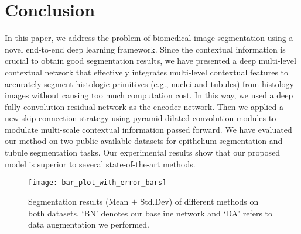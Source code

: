 \documentclass[10pt,twocolumn]{article}
\begin{document}
\section{Conclusion}\label{s5}
In this paper, we address the problem of biomedical image segmentation using a novel end-to-end deep learning framework. Since the contextual information is crucial to obtain good segmentation results, we have presented a deep multi-level contextual network that effectively integrates multi-level contextual features to accurately segment histologic primitives (e.g., nuclei and tubules) from histology images without causing too much computation cost. In this way, we used a deep fully convolution residual network as the encoder network. Then we applied a new skip connection strategy using pyramid dilated convolution modules to modulate multi-scale contextual information passed forward.
We have evaluated our method on two public available datasets for epithelium segmentation and tubule segmentation tasks.
Our experimental results show that our proposed model is superior to several state-of-the-art methods.

\begin{figure}[h]
\centering
\texttt{[image: bar\_plot\_with\_error\_bars]}
\caption{Segmentation results (Mean $\pm$ Std.Dev) of different methods on both datasets. \lq BN\rq \space
 denotes our baseline network and \lq DA\rq \space
refers to data augmentation we performed.}
\label{f8}
\end{figure}
\end{document}
